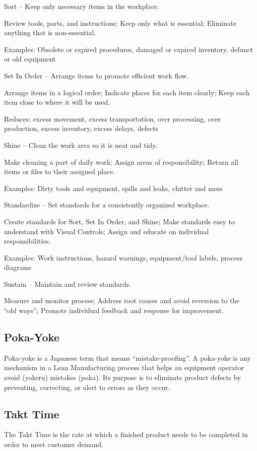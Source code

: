 \documentclass{sigplanconf}
\begin{document}
Sort – Keep only necessary items in the workplace.

    Review tools, parts, and instructions;
    Keep only what is essential;
    Eliminate anything that is non-essential.

Examples: Obsolete or expired procedures, damaged or expired inventory, defunct or old equipment

Set In Order – Arrange items to promote efficient work flow.

    Arrange items in a logical order;
    Indicate places for each item clearly;
    Keep each item close to where it will be used.

Reduces: excess movement, excess transportation, over processing, over production, excess inventory, excess delays, defects

Shine – Clean the work area so it is neat and tidy.

    Make cleaning a part of daily work;
    Assign areas of responsibility;
    Return all items or files to their assigned place.

Examples: Dirty tools and equipment, spills and leaks, clutter and mess

Standardize – Set standards for a consistently organized workplace.

    Create standards for Sort, Set In Order, and Shine;
    Make standards easy to understand with Visual Controls;
    Assign and educate on individual responsibilities.

Examples: Work instructions, hazard warnings, equipment/tool labels, process diagrams

Sustain – Maintain and review standards.

    Measure and monitor process;
    Address root causes and avoid reversion to the “old ways”;
    Promote individual feedback and response for improvement.

\subsection{Poka-Yoke}
Poka-yoke is a Japanese term that means “mistake-proofing”. A poka-yoke is any mechanism in a Lean Manufacturing process that helps an equipment operator avoid (yokeru) mistakes (poka). Its purpose is to eliminate product defects by preventing, correcting, or alert to errors as they occur.

\subsection{Takt Time}
The Takt Time is the rate at which a finished product needs to be completed in order to meet customer demand.
\end{document}
